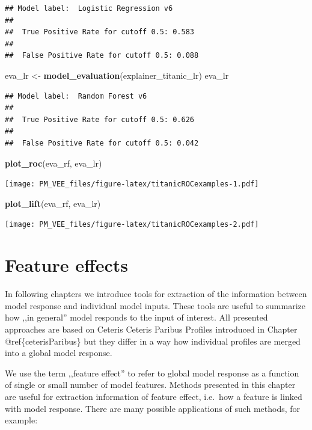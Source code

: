 \documentclass[12pt,]{krantz}
\newenvironment{Shaded}{\begin{snugshade}}{\end{snugshade}}
\newcommand{\KeywordTok}[1]{\textcolor[rgb]{0.13,0.29,0.53}{\textbf{#1}}}
\newcommand{\NormalTok}[1]{#1}
\newcommand{\StringTok}[1]{\textcolor[rgb]{0.31,0.60,0.02}{#1}}
\begin{document}
\begin{verbatim}
## Model label:  Logistic Regression v6 
## 
##  True Positive Rate for cutoff 0.5: 0.583 
## 
##  False Positive Rate for cutoff 0.5: 0.088
\end{verbatim}

\begin{Shaded}
\begin{Highlighting}[]
\NormalTok{eva_lr <-}\StringTok{ }\KeywordTok{model_evaluation}\NormalTok{(explainer_titanic_lr)}
\NormalTok{eva_lr}
\end{Highlighting}
\end{Shaded}

\begin{verbatim}
## Model label:  Random Forest v6 
## 
##  True Positive Rate for cutoff 0.5: 0.626 
## 
##  False Positive Rate for cutoff 0.5: 0.042
\end{verbatim}

\begin{Shaded}
\begin{Highlighting}[]
\KeywordTok{plot_roc}\NormalTok{(eva_rf, eva_lr)}
\end{Highlighting}
\end{Shaded}

\texttt{[image: PM\_VEE\_files/figure-latex/titanicROCexamples-1.pdf]}

\begin{Shaded}
\begin{Highlighting}[]
\KeywordTok{plot_lift}\NormalTok{(eva_rf, eva_lr)}
\end{Highlighting}
\end{Shaded}

\texttt{[image: PM\_VEE\_files/figure-latex/titanicROCexamples-2.pdf]}

\hypertarget{featureEffects}{%
\section{Feature effects}\label{featureEffects}}

In following chapters we introduce tools for extraction of the information between model response and individual model inputs. These tools are useful to summarize how ,,in general'' model responds to the input of interest. All presented approaches are based on Ceteris Ceteris Paribus Profiles introduced in Chapter @ref\{ceterisParibus\} but they differ in a way how individual profiles are merged into a global model response.

We use the term ,,feature effect'' to refer to global model response as a function of single or small number of model features.
Methods presented in this chapter are useful for extraction information of feature effect, i.e.~how a feature is linked with model response. There are many possible applications of such methods, for example:
\end{document}
